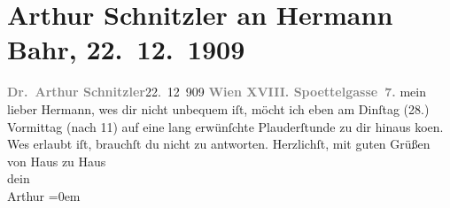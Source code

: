 

         
         \renewcommand{\erwaehntePersonen}{Personen: Hermann Bahr}
         \renewcommand{\erwaehnteOrte}{Orte: Edmund-Weiß-Gasse, Wien}
         \renewcommand{\erwaehnteWerke}{}
               \section[Arthur Schnitzler an Hermann Bahr, 22. 12. 1909]{ Arthur Schnitzler an Hermann Bahr, 22. 12. 1909}\nopagebreak{}\rehead{ }\begin{ledgroupsized}[t]{13cm}\normalsize\beginnumbering \toendnotes[C]{\smallbreak\pagebreak[2]} 
\pstart
           \noindent{}{\pb}\textcolor{gray}{\textbf{Dr. Arthur Schnitzler}}\hfill 22. 12 909\pend
           \pstart
           \textcolor{gray}{\textbf{Wien XVIII. Spoettelgasse 7.}}\pend
           \pstart
           mein lieber Hermann, we{\geminationn}s dir nicht
               unbequem iſt, möcht ich eben am Dinſtag (28.) Vormittag (nach
                  11) auf eine lang erwünſchte Plauderſtunde zu dir hinaus ko{\geminationm}en. We{\geminationn}s erlaubt iſt,
               brauchſt {\pb}du nicht zu
               antworten.\pend
           \pstart
           Herzlichſt, mit guten Grüßen von Haus zu Haus{\\[\baselineskip]}dein{\\[\baselineskip]}\spacefill\mbox{Arthur}\pend
           \leftskip=0em{}
         
         \endnumbering{}\end{ledgroupsized}  \newcommand{\dateiname}{L01907}\newcommand{\titel}{Arthur Schnitzler an Hermann Bahr, 22. 12. 1909}\newcommand{\editorInnen}{ Kurt Ifkovits,  Martin Anton Müller}
      